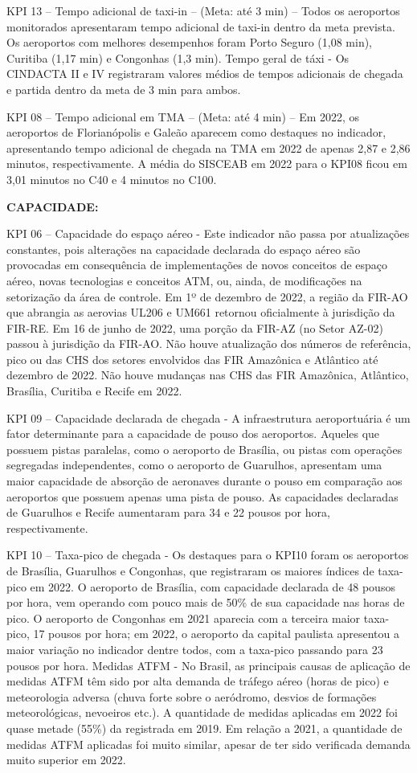 \documentclass[
]{book}
\begin{document}
KPI 13 -- Tempo adicional de taxi-in -- (Meta: até 3 min) -- Todos os aeroportos monitorados apresentaram tempo adicional de taxi-in dentro da meta prevista. Os aeroportos com melhores desempenhos foram Porto Seguro (1,08 min), Curitiba (1,17 min) e Congonhas (1,3 min).
Tempo geral de táxi - Os CINDACTA II e IV registraram valores médios de tempos adicionais de chegada e partida dentro da meta de 3 min para ambos.

KPI 08 -- Tempo adicional em TMA -- (Meta: até 4 min) -- Em 2022, os aeroportos de Florianópolis e Galeão aparecem como destaques no indicador, apresentando tempo adicional de chegada na TMA em 2022 de apenas 2,87 e 2,86 minutos, respectivamente. A média do SISCEAB em 2022 para o KPI08 ficou em 3,01 minutos no C40 e 4 minutos no C100.

\textbf{CAPACIDADE:}

KPI 06 -- Capacidade do espaço aéreo - Este indicador não passa por atualizações constantes, pois alterações na capacidade declarada do espaço aéreo são provocadas em consequência de implementações de novos conceitos de espaço aéreo, novas tecnologias e conceitos ATM, ou, ainda, de modificações na setorização da área de controle. Em 1º de dezembro de 2022, a região da FIR-AO que abrangia as aerovias UL206 e UM661 retornou oficialmente à jurisdição da FIR-RE. Em 16 de junho de 2022, uma porção da FIR-AZ (no Setor AZ-02) passou à jurisdição da FIR-AO. Não houve atualização dos números de referência, pico ou das CHS dos setores envolvidos das FIR Amazônica e Atlântico até dezembro de 2022. Não houve mudanças nas CHS das FIR Amazônica, Atlântico, Brasília, Curitiba e Recife em 2022.

KPI 09 -- Capacidade declarada de chegada - A infraestrutura aeroportuária é um fator determinante para a capacidade de pouso dos aeroportos. Aqueles que possuem pistas paralelas, como o aeroporto de Brasília, ou pistas com operações segregadas independentes, como o aeroporto de Guarulhos, apresentam uma maior capacidade de absorção de aeronaves durante o pouso em comparação aos aeroportos que possuem apenas uma pista de pouso. As capacidades declaradas de Guarulhos e Recife aumentaram para 34 e 22 pousos por hora, respectivamente.

KPI 10 -- Taxa-pico de chegada - Os destaques para o KPI10 foram os aeroportos de Brasília, Guarulhos e Congonhas, que registraram os maiores índices de taxa-pico em 2022. O aeroporto de Brasília, com capacidade declarada de 48 pousos por hora, vem operando com pouco mais de 50\% de sua capacidade nas horas de pico. O aeroporto de Congonhas em 2021 aparecia com a terceira maior taxa-pico, 17 pousos por hora; em 2022, o aeroporto da capital paulista apresentou a maior variação no indicador dentre todos, com a taxa-pico passando para 23 pousos por hora.
Medidas ATFM - No Brasil, as principais causas de aplicação de medidas ATFM têm sido por alta demanda de tráfego aéreo (horas de pico) e meteorologia adversa (chuva forte sobre o aeródromo, desvios de formações meteorológicas, nevoeiros etc.). A quantidade de medidas aplicadas em 2022 foi quase metade (55\%) da registrada em 2019. Em relação a 2021, a quantidade de medidas ATFM aplicadas foi muito similar, apesar de ter sido verificada demanda muito superior em 2022.
\end{document}
